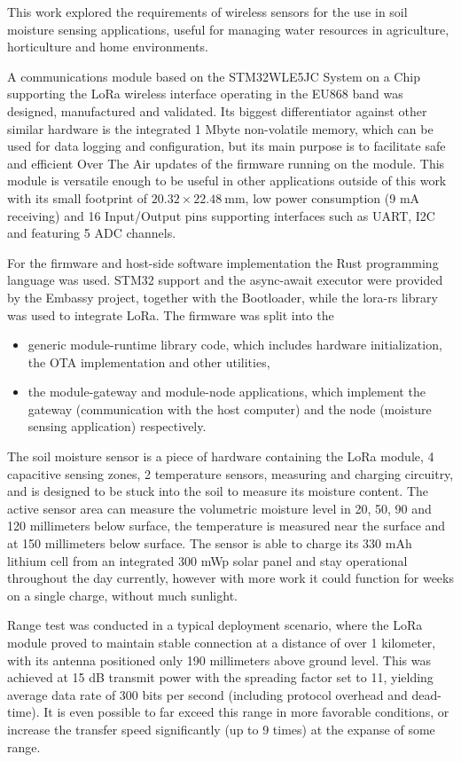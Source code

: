 
This work explored the requirements of wireless sensors for the use in soil moisture sensing applications, useful for managing water resources in agriculture, horticulture and home environments.

A communications module based on the STM32WLE5JC System on a Chip supporting the LoRa wireless interface operating in the EU868 band was designed, manufactured and validated. Its biggest differentiator against other similar hardware is the integrated 1 Mbyte non-volatile memory, which can be used for data logging and configuration, but its main purpose is to facilitate safe and efficient Over The Air updates of the firmware running on the module. This module is versatile enough to be useful in other applications outside of this work with its small footprint of $20.32 \times 22.48~\mathrm{mm}$, low power consumption (9 mA receiving) and 16 Input/Output pins supporting interfaces such as UART, I2C and featuring 5 ADC channels.

For the firmware and host-side software implementation the Rust programming language was used. STM32 support and the async-await executor were provided by the Embassy project, together with the Bootloader, while the lora-rs library was used to integrate LoRa. The firmware was split into the 
\begin{itemize}
    \item generic module-runtime library code, which includes hardware initialization, the OTA implementation and other utilities,
    \item the module-gateway and module-node applications, which implement the gateway (communication with the host computer) and the node (moisture sensing application) respectively.
\end{itemize}

The soil moisture sensor is a piece of hardware containing the LoRa module, 4 capacitive sensing zones, 2 temperature sensors, measuring and charging circuitry, and is designed to be stuck into the soil to measure its moisture content. The active sensor area can measure the volumetric moisture level in 20, 50, 90 and 120 millimeters below surface, the temperature is measured near the surface and at 150 millimeters below surface. The sensor is able to charge its 330 mAh lithium cell from an integrated 300 mWp solar panel and stay operational throughout the day currently, however with more work it could function for weeks on a single charge, without much sunlight.

Range test was conducted in a typical deployment scenario, where the LoRa module proved to maintain stable connection at a distance of over 1 kilometer, with its antenna positioned only 190 millimeters above ground level. This was achieved at 15 dB transmit power with the spreading factor set to 11, yielding average data rate of 300 bits per second (including protocol overhead and dead-time). It is even possible to far exceed this range in more favorable conditions, or increase the transfer speed significantly (up to 9 times) at the expanse of some range.
